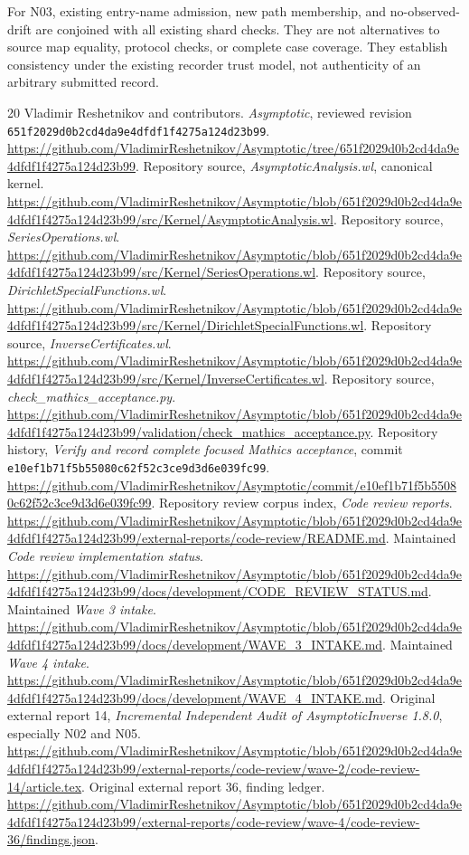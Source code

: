 \documentclass[11pt,letterpaper]{article}
\newcommand{\pin}{651f2029d0b2cd4da9e4dfdf1f4275a124d23b99}
\begin{document}
For N03, existing entry-name admission, new path membership, and no-observed-drift are
conjoined with all existing shard checks. They are not alternatives to source
map equality, protocol checks, or complete case coverage. They establish
consistency under the existing recorder trust model, not authenticity of an
arbitrary submitted record.

\begin{thebibliography}{20}
\small
{} Vladimir Reshetnikov and contributors.
\emph{Asymptotic}, reviewed revision \texttt{\pin}.
\url{https://github.com/VladimirReshetnikov/Asymptotic/tree/651f2029d0b2cd4da9e4dfdf1f4275a124d23b99}.
 Repository source, \emph{AsymptoticAnalysis.wl}, canonical kernel.
\url{https://github.com/VladimirReshetnikov/Asymptotic/blob/651f2029d0b2cd4da9e4dfdf1f4275a124d23b99/src/Kernel/AsymptoticAnalysis.wl}.
 Repository source, \emph{SeriesOperations.wl}.
\url{https://github.com/VladimirReshetnikov/Asymptotic/blob/651f2029d0b2cd4da9e4dfdf1f4275a124d23b99/src/Kernel/SeriesOperations.wl}.
 Repository source, \emph{DirichletSpecialFunctions.wl}.
\url{https://github.com/VladimirReshetnikov/Asymptotic/blob/651f2029d0b2cd4da9e4dfdf1f4275a124d23b99/src/Kernel/DirichletSpecialFunctions.wl}.
 Repository source, \emph{InverseCertificates.wl}.
\url{https://github.com/VladimirReshetnikov/Asymptotic/blob/651f2029d0b2cd4da9e4dfdf1f4275a124d23b99/src/Kernel/InverseCertificates.wl}.
 Repository source, \emph{check\_mathics\_acceptance.py}.
\url{https://github.com/VladimirReshetnikov/Asymptotic/blob/651f2029d0b2cd4da9e4dfdf1f4275a124d23b99/validation/check_mathics_acceptance.py}.
 Repository history, \emph{Verify and record complete
focused Mathics acceptance}, commit \texttt{e10ef1b71f5b55080c62f52c3ce9d3d6e039fc99}.
\url{https://github.com/VladimirReshetnikov/Asymptotic/commit/e10ef1b71f5b55080c62f52c3ce9d3d6e039fc99}.
 Repository review corpus index, \emph{Code review reports}.
\url{https://github.com/VladimirReshetnikov/Asymptotic/blob/651f2029d0b2cd4da9e4dfdf1f4275a124d23b99/external-reports/code-review/README.md}.
 Maintained \emph{Code review implementation status}.
\url{https://github.com/VladimirReshetnikov/Asymptotic/blob/651f2029d0b2cd4da9e4dfdf1f4275a124d23b99/docs/development/CODE_REVIEW_STATUS.md}.
 Maintained \emph{Wave 3 intake}.
\url{https://github.com/VladimirReshetnikov/Asymptotic/blob/651f2029d0b2cd4da9e4dfdf1f4275a124d23b99/docs/development/WAVE_3_INTAKE.md}.
 Maintained \emph{Wave 4 intake}.
\url{https://github.com/VladimirReshetnikov/Asymptotic/blob/651f2029d0b2cd4da9e4dfdf1f4275a124d23b99/docs/development/WAVE_4_INTAKE.md}.
 Original external report 14, \emph{Incremental Independent Audit of
AsymptoticInverse 1.8.0}, especially N02 and N05.
\url{https://github.com/VladimirReshetnikov/Asymptotic/blob/651f2029d0b2cd4da9e4dfdf1f4275a124d23b99/external-reports/code-review/wave-2/code-review-14/article.tex}.
 Original external report 36, finding ledger.
\url{https://github.com/VladimirReshetnikov/Asymptotic/blob/651f2029d0b2cd4da9e4dfdf1f4275a124d23b99/external-reports/code-review/wave-4/code-review-36/findings.json}.
\end{thebibliography}
\end{document}
